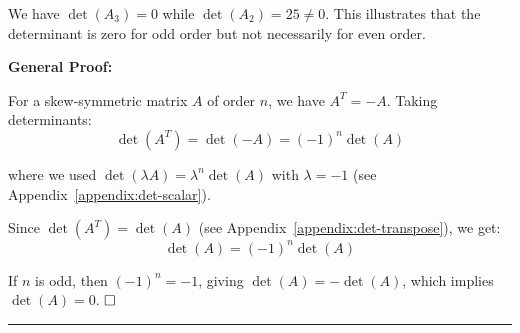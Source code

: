We have $\det(A_3) = 0$ while $\det(A_2) = 25 \neq 0$. This illustrates that the determinant is zero for odd order but not necessarily for even order.

\vspace{0.5em}

\textbf{General Proof:}

For a skew-symmetric matrix $A$ of order $n$, we have $A^T = -A$. Taking determinants:
$$\det(A^T) = \det(-A) = (-1)^n \det(A)$$

where we used $\det(\lambda A) = \lambda^n \det(A)$ with $\lambda = -1$ (see Appendix~\ref{appendix:det-scalar}).

Since $\det(A^T) = \det(A)$ (see Appendix~\ref{appendix:det-transpose}), we get:
$$\det(A) = (-1)^n \det(A)$$

If $n$ is odd, then $(-1)^n = -1$, giving $\det(A) = -\det(A)$, which implies $\det(A) = 0$. $\hfill \square$

\vspace{2em}
\noindent\rule{\textwidth}{0.4pt}

